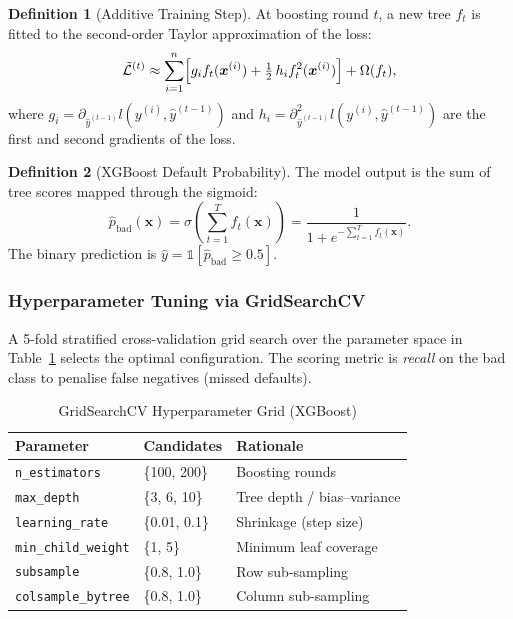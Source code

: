 \documentclass[12pt,a4paper]{article}
\theoremstyle{definition}
\newtheorem{definition}{Definition}[section]
\newcommand{\code}[1]{\texttt{#1}}
\newcommand{\bfmath}[1]{\boldsymbol{#1}}
\begin{document}
\begin{definition}[Additive Training Step]
  At boosting round $t$, a new tree $f_t$ is fitted to the second-order
  Taylor approximation of the loss:
  \begin{equation}
    \tilde{\mathcal{L}}^{(t)} \approx \sum_{i=1}^{n}
      \Bigl[g_i f_t(\bfmath{x}^{(i)}) + \tfrac{1}{2}\,h_i f_t^2(\bfmath{x}^{(i)})\Bigr]
      + \Omega(f_t),
    \label{eq:xgb-taylor}
  \end{equation}
  where $g_i = \partial_{\hat{y}^{(t-1)}} l(y^{(i)}, \hat{y}^{(t-1)})$ and
  $h_i = \partial^2_{\hat{y}^{(t-1)}} l(y^{(i)}, \hat{y}^{(t-1)})$ are the
  first and second gradients of the loss.
\end{definition}

\begin{definition}[XGBoost Default Probability]
  The model output is the sum of tree scores mapped through the sigmoid:
  \begin{equation}
    \hat{p}_{\text{bad}}(\bfmath{x}) =
      \sigma\!\left(\sum_{t=1}^{T} f_t(\bfmath{x})\right)
      = \frac{1}{1 + e^{-\sum_{t=1}^{T} f_t(\bfmath{x})}}.
    \label{eq:xgb-prob}
  \end{equation}
  The binary prediction is $\hat{y} = \mathbb{1}[\hat{p}_{\text{bad}} \geq 0.5]$.
\end{definition}

\subsubsection{Hyperparameter Tuning via GridSearchCV}

A 5-fold stratified cross-validation grid search over the parameter space in
Table~\ref{tab:grid} selects the optimal configuration.  The scoring metric is
\emph{recall} on the bad class to penalise false negatives (missed defaults).

\begin{table}[H]
  \centering
  \caption{GridSearchCV Hyperparameter Grid (XGBoost)}
  \label{tab:grid}
  \begin{tabular}{lll}
    \toprule
    \textbf{Parameter}                    & \textbf{Candidates}      & \textbf{Rationale} \\
    \midrule
    \code{n\_estimators}                  & \{100, 200\}             & Boosting rounds \\
    \code{max\_depth}                     & \{3, 6, 10\}             & Tree depth / bias–variance \\
    \code{learning\_rate}                 & \{0.01, 0.1\}            & Shrinkage (step size) \\
    \code{min\_child\_weight}             & \{1, 5\}                 & Minimum leaf coverage \\
    \code{subsample}                      & \{0.8, 1.0\}             & Row sub-sampling \\
    \code{colsample\_bytree}              & \{0.8, 1.0\}             & Column sub-sampling \\
    \bottomrule
  \end{tabular}
\end{table}
\end{document}
